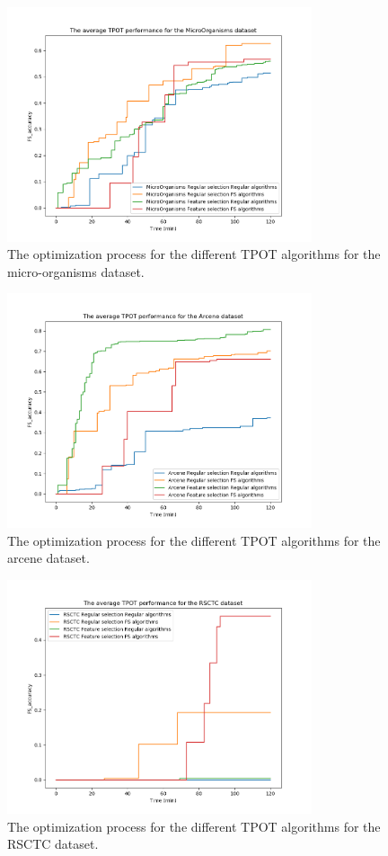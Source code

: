 \documentclass[10pt,a4paper]{report}
\begin{document}
	\begin{figure}[H]
		\centering
		\includegraphics[width=0.8\textwidth]{TPOT_avg_MO.PNG}
		\caption{The optimization process for the different TPOT algorithms for the micro-organisms dataset.}
		\label{fig:TPOTResultMO}
	\end{figure}
	
	\begin{figure}[H]
		\centering
		\includegraphics[width=0.8\textwidth]{TPOT_avg_Arcene.PNG}
		\caption{The optimization process for the different TPOT algorithms for the arcene dataset.}
		\label{fig:TPOTResultArcene}
	\end{figure}
	
	\begin{figure}[H]
		\centering
		\includegraphics[width=0.8\textwidth]{TPOT_avg_RSCTC.PNG}
		\caption{The optimization process for the different TPOT algorithms for the RSCTC dataset.}
		\label{fig:TPOTResultRSCTC}
	\end{figure}
	
\end{document}
